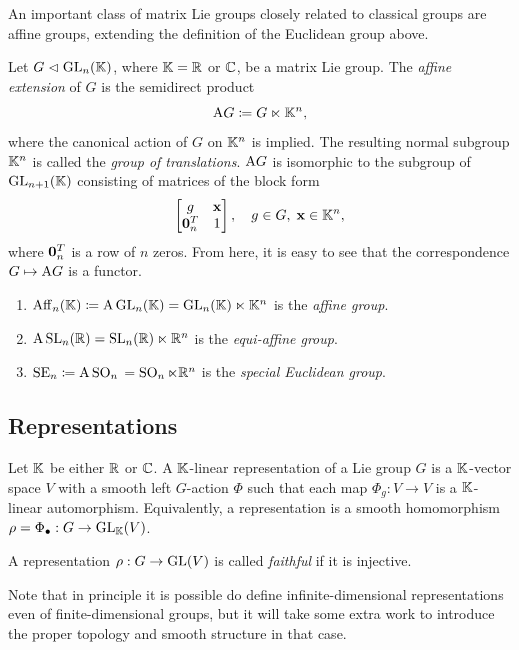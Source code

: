 An important class of matrix Lie groups closely related to classical groups are affine groups, extending the definition of the Euclidean group above.

\begin{defn}
    Let $G\sub \GL_n(\bbK)$, where $\bbK=\bbR$ or $\bbC$, be a matrix Lie group. The \emph{affine extension} of $G$ is the semidirect product 
    \[\rmA G\coloneqq G\ltimes \bbK^n,\]
    where the canonical action of $G$ on $\bbK^n$ is implied. The resulting normal subgroup $\bbK^n$ is called the \emph{group of translations}. $\rmA G$ is isomorphic to the subgroup of $\GL_{n+1}(\bbK)$ consisting of matrices of the block form
    \[\begin{bmatrix}
        g & \bf{x}\\
        \bf{0}_n^T & 1
    \end{bmatrix},\quad g\in G,\; \bf{x}\in\bbK^n,\]
    where $\bf{0}_n^T$ is a row of $n$ zeros. From here, it is easy to see that the correspondence $G\mapsto \rmA G$ is a functor.
\end{defn}

\begin{example}
    \begin{enumerate}
        \item $\Aff_n(\bbK)\coloneqq \rmA \GL_n(\bbK)=\GL_n(\bbK)\ltimes\bbK^n$ is the \emph{affine group}.
        \item $\rmA \SL_n(\bbR)=\SL_n(\bbR)\ltimes \bbR^n$ is the \emph{equi-affine group}.
        \item $\SE_n\coloneqq \rmA \SO_n{}= \SO_n\ltimes\bbR^n$ is the \emph{special Euclidean group}.
    \end{enumerate}
\end{example}










\subsection{Representations}

\begin{defn}
    Let $\bbK$ be either $\bbR$ or $\bbC$. A $\bbK$-linear representation of a Lie group $G$ is a $\bbK$-vector space $V$ with a smooth left $G$-action $\Phi$ such that each map $\Phi_g:V\to V$ is a $\bbK$-linear automorphism. Equivalently, a representation is a smooth homomorphism $\rho=\Phi_\bullet:G\to \GL_{\bbK}(V)$. 

    A representation $\rho :G\to \GL(V)$ is called \emph{faithful} if it is injective.
\end{defn}
Note that in principle it is possible do define infinite-dimensional representations even of finite-dimensional groups, but it will take some extra work to introduce the proper topology and smooth structure in that case.

